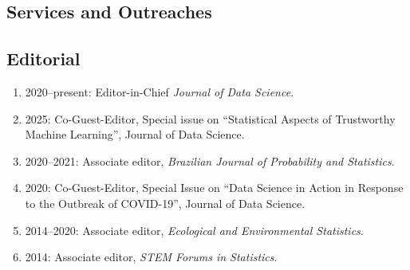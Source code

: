 \documentclass[Statistics]{vita}
\begin{document}
\begin{vita}
  \section{Services and Outreaches}
  \subsection{Editorial}
  \begin{enumerate}
  \item 2020--present: Editor-in-Chief \emph{Journal of Data Science}.
  \item 2025: Co-Guest-Editor, Special issue on ``Statistical Aspects of Trustworthy Machine Learning'', Journal of Data Science.
  \item 2020--2021: Associate editor, \emph{Brazilian Journal of Probability and Statistics}.
  \item 2020: Co-Guest-Editor, Special Issue on ``Data Science in Action in Response to the Outbreak of COVID-19'', Journal of Data Science.
  \item 2014--2020: Associate editor,  \emph{Ecological and Environmental Statistics}.
  \item 2014: Associate editor, \emph{STEM Forums in Statistics}.
  \end{enumerate}

\end{vita}
\end{document}
